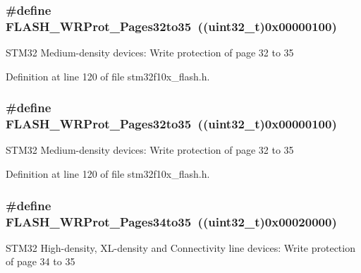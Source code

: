\subsubsection[{\texorpdfstring{F\+L\+A\+S\+H\+\_\+\+W\+R\+Prot\+\_\+\+Pages32to35}{FLASH_WRProt_Pages32to35}}]{\setlength{\rightskip}{0pt plus 5cm}\#define F\+L\+A\+S\+H\+\_\+\+W\+R\+Prot\+\_\+\+Pages32to35~(({\bf uint32\+\_\+t})0x00000100)}\hypertarget{group___option___bytes___write___protection_ga81a4250850e5fe7c251365cc22839a96}{}\label{group___option___bytes___write___protection_ga81a4250850e5fe7c251365cc22839a96}
S\+T\+M32 Medium-\/density devices\+: Write protection of page 32 to 35 

Definition at line 120 of file stm32f10x\+\_\+flash.\+h.

\subsubsection[{\texorpdfstring{F\+L\+A\+S\+H\+\_\+\+W\+R\+Prot\+\_\+\+Pages32to35}{FLASH_WRProt_Pages32to35}}]{\setlength{\rightskip}{0pt plus 5cm}\#define F\+L\+A\+S\+H\+\_\+\+W\+R\+Prot\+\_\+\+Pages32to35~(({\bf uint32\+\_\+t})0x00000100)}\hypertarget{group___option___bytes___write___protection_ga81a4250850e5fe7c251365cc22839a96}{}\label{group___option___bytes___write___protection_ga81a4250850e5fe7c251365cc22839a96}
S\+T\+M32 Medium-\/density devices\+: Write protection of page 32 to 35 

Definition at line 120 of file stm32f10x\+\_\+flash.\+h.

\subsubsection[{\texorpdfstring{F\+L\+A\+S\+H\+\_\+\+W\+R\+Prot\+\_\+\+Pages34to35}{FLASH_WRProt_Pages34to35}}]{\setlength{\rightskip}{0pt plus 5cm}\#define F\+L\+A\+S\+H\+\_\+\+W\+R\+Prot\+\_\+\+Pages34to35~(({\bf uint32\+\_\+t})0x00020000)}\hypertarget{group___option___bytes___write___protection_gaa5fee32ae0631b81413414f8e716868b}{}\label{group___option___bytes___write___protection_gaa5fee32ae0631b81413414f8e716868b}
S\+T\+M32 High-\/density, X\+L-\/density and Connectivity line devices\+: Write protection of page 34 to 35 

